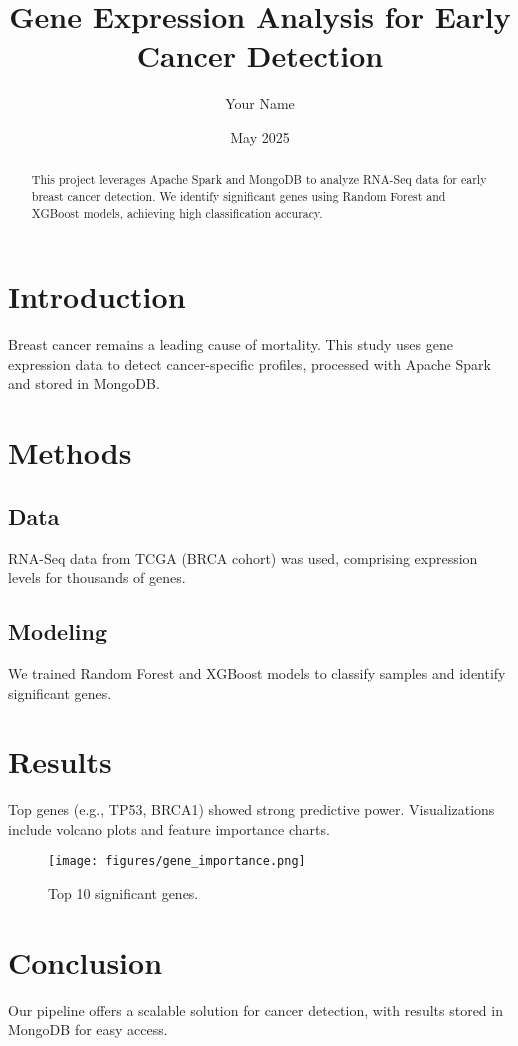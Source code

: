 \documentclass[a4paper,12pt]{article}
\begin{document}
\title{Gene Expression Analysis for Early Cancer Detection}
\author{Your Name}
\date{May 2025}
\maketitle

\begin{abstract}
This project leverages Apache Spark and MongoDB to analyze RNA-Seq data for early breast cancer detection. We identify significant genes using Random Forest and XGBoost models, achieving high classification accuracy.
\end{abstract}

\section{Introduction}
Breast cancer remains a leading cause of mortality. This study uses gene expression data to detect cancer-specific profiles, processed with Apache Spark and stored in MongoDB.

\section{Methods}
\subsection{Data}
RNA-Seq data from TCGA (BRCA cohort) was used, comprising expression levels for thousands of genes.

\subsection{Modeling}
We trained Random Forest and XGBoost models to classify samples and identify significant genes.

\section{Results}
Top genes (e.g., TP53, BRCA1) showed strong predictive power. Visualizations include volcano plots and feature importance charts.

\begin{figure}
    \centering
    \texttt{[image: figures/gene\_importance.png]}
    \caption{Top 10 significant genes.}
\end{figure}

\section{Conclusion}
Our pipeline offers a scalable solution for cancer detection, with results stored in MongoDB for easy access.



\end{document}
